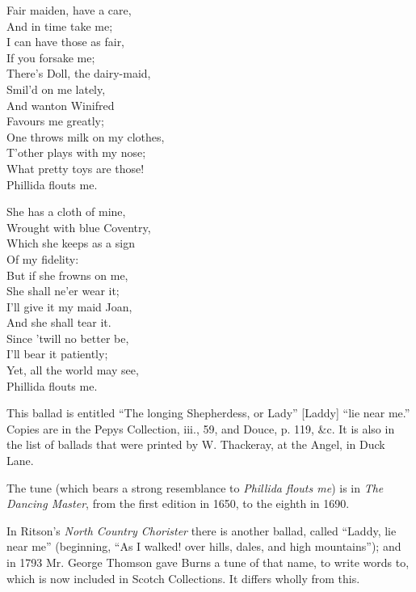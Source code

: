 \begin{dcverse}
\begin{patverse}
Fair maiden, have a care,\\
And in time take me;\\
I can have those as fair,\\
If you forsake me;\\
There’s Doll, the dairy-maid,\\
Smil’d on me lately,\\
And wanton Winifred\\
Favours me greatly;\\
One throws milk on my clothes,\\
T’other plays with my nose;\\
What pretty toys are those!\\
Phillida flouts me.
\end{patverse}

\begin{patverse}
She has a cloth of mine,\\
Wrought with blue Coventry,\\
Which she keeps as a sign\\
Of my fidelity:\\
But if she frowns on me,\\
She shall ne’er wear it;\\
I’ll give it my maid Joan,\\
And she shall tear it.\\
Since ’twill no better be,\\
I’ll bear it patiently;\\
Yet, all the world may see,\\
Phillida flouts me.
\end{patverse}
\end{dcverse}


This ballad is entitled “The longing Shepherdess, or Lady” [Laddy] “lie
near me.” Copies are in the Pepys Collection, iii., 59, and Douce, p. 119, \&c.
It is also in the list of ballads that were printed by W. Thackeray, at the Angel,
in Duck Lane.

The tune (which bears a strong resemblance to \textit{Phillida flouts me}) is in \textit{The
Dancing Master}, from the first edition in 1650, to the eighth in 1690.

\pagebreak

In Ritson’s \textit{North Country Chorister} there is another ballad, called “Laddy, lie
near me” (beginning, “As I walked! over hills, dales, and high mountains”); and
in 1793 Mr. George Thomson gave Burns a tune of that name, to write words to,
which is now included in Scotch Collections. It differs wholly from this.

